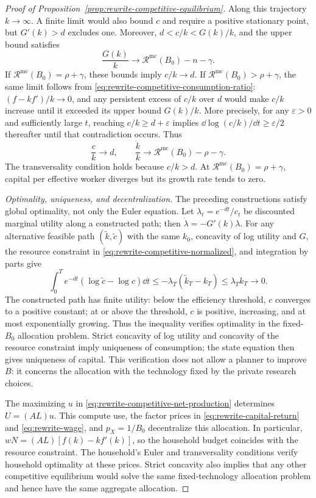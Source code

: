 \begin{proof}[Proof of Proposition~\ref{prop:rewrite-competitive-equilibrium}]
Along this trajectory $k\to\infty$. A finite limit would also bound
$c$ and require a positive stationary point, but $G'(k)>d$ excludes one.
Moreover, $d<c/k<G(k)/k$, and the upper bound satisfies
\[
 \frac{G(k)}k\longrightarrow\mathcal R^{\mathrm{mc}}(B_0)-n-\gamma.
\]
If $\mathcal R^{\mathrm{mc}}(B_0)=\rho+\gamma$, these bounds imply
$c/k\to d$. If $\mathcal R^{\mathrm{mc}}(B_0)>\rho+\gamma$, the same limit follows
from \eqref{eq:rewrite-competitive-consumption-ratio}:
$(f-kf')/k\to0$, and any persistent excess of $c/k$ over $d$
would make $c/k$ increase until it exceeded its upper bound $G(k)/k$.
More precisely, for any $\varepsilon>0$ and sufficiently large
$t$, reaching $c/k\geq d+\varepsilon$ implies
$\dd\log(c/k)/\dd t\geq\varepsilon/2$ thereafter until that
contradiction occurs. Thus
\begin{equation}
 \frac ck\to d,\qquad
 \frac{\dot k}{k}\to\mathcal R^{\mathrm{mc}}(B_0)-\rho-\gamma.
 \label{eq:rewrite-competitive-capital-growth}
\end{equation}
The transversality condition holds because $c/k>d$.
At $\mathcal R^{\mathrm{mc}}(B_0)=\rho+\gamma$, capital per effective
worker diverges but its growth rate tends to zero.

\emph{Optimality, uniqueness, and decentralization.}
The preceding constructions satisfy global optimality, not only the
Euler equation. Let $\lambda_t=e^{-dt}/c_t$ be discounted marginal utility
along a constructed path;
then $\dot\lambda=-G'(k)\lambda$.
For any alternative feasible path $(\widetilde k,\widetilde c)$
with the same $k_0$, concavity of log utility and $G$, the resource
constraint in \eqref{eq:rewrite-competitive-normalized}, and integration
by parts give
\[
 \int_0^T e^{-dt}(\log\widetilde c-\log c)\dd t
 \leq-\lambda_T(\widetilde k_T-k_T)
 \leq\lambda_T k_T\longrightarrow0.
\]
The constructed path has finite utility: below the efficiency threshold,
$c$ converges to a positive constant; at or above the threshold, $c$ is
positive, increasing, and at most exponentially growing. Thus the inequality verifies
optimality in the fixed-$B_0$ allocation problem. Strict concavity of
log utility and concavity of the resource constraint imply uniqueness
of consumption; the state equation then gives uniqueness of capital.
This verification does not allow a planner to improve $B$: it concerns
the allocation with the technology fixed by the private research choices.

The maximizing $u$ in \eqref{eq:rewrite-competitive-net-production}
determines $U=(AL)u$. This compute use, the factor prices in
\eqref{eq:rewrite-capital-return} and \eqref{eq:rewrite-wage}, and
$p_X=1/B_0$ decentralize this allocation.
In particular, $wN=(AL)[f(k)-kf'(k)]$, so the household budget coincides
with the resource constraint. The household's Euler and transversality
conditions verify household optimality at these prices. Strict concavity also implies that
any other competitive equilibrium would solve the same fixed-technology
allocation problem and hence have the same aggregate allocation.


\end{proof}
